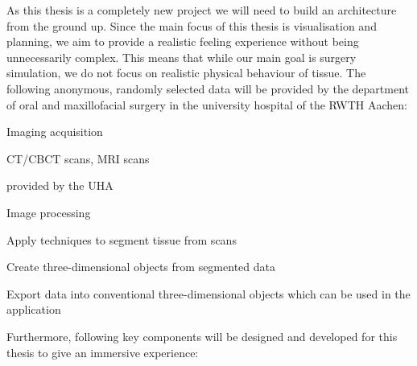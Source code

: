 As this thesis is a completely new project we will need to build an architecture from the ground up.
Since the main focus of this thesis is visualisation and planning, we aim to provide a realistic feeling experience without being unnecessarily complex.
This means that while our main goal is surgery simulation, we do not focus on realistic physical behaviour of tissue.
The following anonymous, randomly selected data will be provided by the department of oral and maxillofacial surgery in the university hospital of the RWTH Aachen:
\begin{compactenum}[label=(\alph*)]
    \item Imaging acquisition
    \begin{compactenum}[label=(\alph*)]
        \item CT/CBCT scans, MRI scans
        \item provided by the UHA
    \end{compactenum}
\item Image processing
    \begin{compactenum}[label=(\alph*)]
        \item Apply techniques to segment tissue from scans
        \item Create three-dimensional objects from segmented data
        \item Export data into conventional three-dimensional objects which can be used in the application
    \end{compactenum}
\end{compactenum}

Furthermore, following key components will be designed and developed for this thesis to give an immersive experience:

